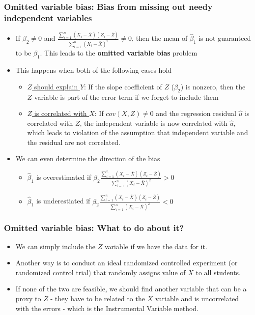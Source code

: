 \documentclass[aspectratio=169]{beamer}
\begin{document}
\begin{frame}
\frametitle{Omitted variable bias: Bias from missing out needy independent variables}
\begin{itemize}
\item If $\beta_2 \neq0$ and $\frac{\sum_{i=1}^n(X_i-\bar{X})(Z_i-\bar{Z})}{\sum_{i=1}^n(X_i-\bar{X})^2}\neq 0$, then the mean of $\hat{\beta}_1$ is not guaranteed to be $\beta_1$. This leads to the \textbf{omitted variable bias} problem
\item This happens when both of the following cases hold
\begin{itemize}
\item \underline{$Z$ should explain $Y$}: If the slope coefficient of $Z$ ($\beta_2$) is nonzero, then the $Z$ variable is part of the error term if we forget to include them
\item \underline{$Z$ is correlated with $X$}: If $cov(X,Z)\neq0$ and the regression residual $\hat{u}$ is correlated with $Z$, the independent variable is now correlated with $\hat{u}$, which leads to violation of the assumption that independent variable and the residual are not correlated.
\end{itemize}
\item We can even determine the direction of the bias
\begin{itemize}
\item $\hat{\beta}_1$ is overestimated if $\beta_2\frac{\sum_{i=1}^n(X_i-\bar{X})(Z_i-\bar{Z})}{\sum_{i=1}^n(X_i-\bar{X})^2}>0$
\item $\hat{\beta}_1$ is underestiated  if $\beta_2\frac{\sum_{i=1}^n(X_i-\bar{X})(Z_i-\bar{Z})}{\sum_{i=1}^n(X_i-\bar{X})^2}<0$
\end{itemize}
\end{itemize}
\end{frame}

\begin{frame}
\frametitle{Omitted variable bias: What to do about it?}
\begin{itemize}
\item We can simply include the $Z$ variable if we have the data for it. 
\item Another way is to conduct an ideal randomized controlled experiment (or randomized control trial) that randomly assigns value of $X$ to all students.
\item If none of the two are feasible, we should find another variable that can be a proxy to $Z$ - they have to be related to the $X$ variable and is uncorrelated with the errors - which is the Instrumental Variable method.
\end{itemize}
\end{frame}
\end{document}
